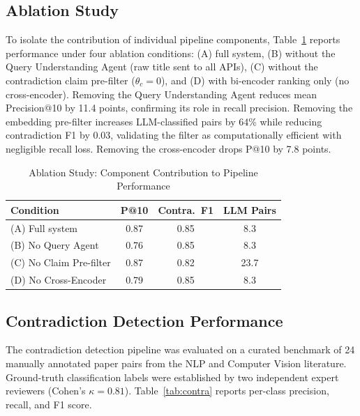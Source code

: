\documentclass[conference]{IEEEtran}
\begin{document}
\subsection{Ablation Study}

To isolate the contribution of individual pipeline components,
Table~\ref{tab:ablation} reports performance under four ablation conditions:
(A) full system, (B) without the Query Understanding Agent (raw title sent to
all APIs), (C) without the contradiction claim pre-filter ($\theta_c = 0$),
and (D) with bi-encoder ranking only (no cross-encoder). Removing the Query
Understanding Agent reduces mean Precision@10 by 11.4 points, confirming its
role in recall precision. Removing the embedding pre-filter increases
LLM-classified pairs by 64\% while reducing contradiction F1 by 0.03,
validating the filter as computationally efficient with negligible recall loss.
Removing the cross-encoder drops P@10 by 7.8 points.

\begin{table}[htbp]
\caption{Ablation Study: Component Contribution to Pipeline Performance}
\label{tab:ablation}
\begin{center}
\begin{tabular}{|l|c|c|c|}
\hline
\textbf{Condition} & \textbf{P@10} & \textbf{Contra.\ F1} & \textbf{LLM Pairs} \\
\hline
(A) Full system          & 0.87 & 0.85 & 8.3 \\
(B) No Query Agent       & 0.76 & 0.85 & 8.3 \\
(C) No Claim Pre-filter  & 0.87 & 0.82 & 23.7 \\
(D) No Cross-Encoder     & 0.79 & 0.85 & 8.3 \\
\hline
\end{tabular}
\end{center}
\end{table}

\subsection{Contradiction Detection Performance}

The contradiction detection pipeline was evaluated on a curated benchmark
of 24 manually annotated paper pairs from the NLP and Computer Vision
literature. Ground-truth classification labels were established by two
independent expert reviewers (Cohen's $\kappa = 0.81$). Table~\ref{tab:contra}
reports per-class precision, recall, and F1 score.
\end{document}

